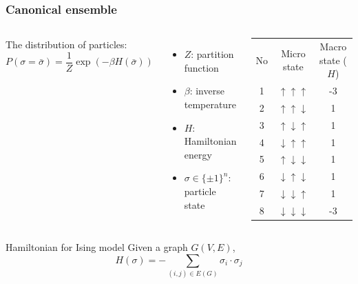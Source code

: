 \documentclass[notheorems]{beamer}
\begin{document}
\begin{frame}
\frametitle{Canonical ensemble}
\begin{columns}
The distribution of particles:
\begin{equation*}
P(\sigma = \bar{\sigma}) = \frac{1}{Z} \exp(-\beta H(\bar{\sigma}))
\end{equation*}
\begin{itemize}
	\item $Z$: partition function
	\item $\beta$: inverse temperature
	\item $H$: Hamiltonian energy
	\item $\sigma \in \{\pm 1\}^n$: particle state 
\end{itemize}
	\begin{tabular}{ccc}
		No & Micro state & Macro state ($H$) \\
		1 & $\uparrow\uparrow\uparrow$ & -3 \\
		2 & $\uparrow\uparrow\downarrow$ & 1 \\
		3 & $\uparrow\downarrow\uparrow$ & 1 \\
		4 & $\downarrow\uparrow\uparrow$ & 1 \\
		5 & $\uparrow\downarrow\downarrow$ & 1 \\
6 & $\downarrow\uparrow\downarrow$ & 1 \\
7 & $\downarrow\downarrow\uparrow$ & 1 \\
8 & $\downarrow\downarrow\downarrow$ & -3 \\
	\end{tabular}
\end{columns}
\begin{block}{Hamiltonian for Ising model}
	Given a graph $G(V, E)$,
	\begin{equation*}
	H(\sigma) = -\sum_{(i,j) \in E(G)} \sigma_i \cdot \sigma_j
	\end{equation*}
\end{block}

\end{frame}
\end{document}
